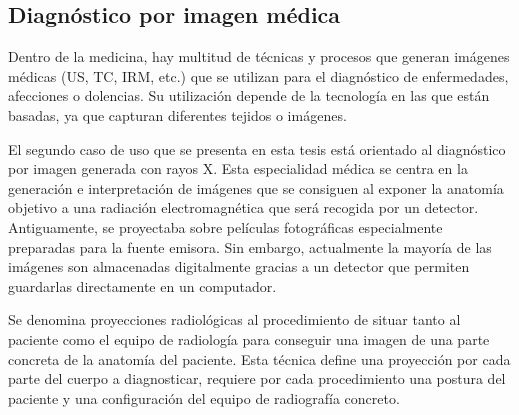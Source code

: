 \subsection{Diagnóstico por imagen médica}
\label{art:xraysim}

Dentro de la medicina, hay multitud de técnicas y procesos que generan imágenes médicas (\ac{US}, \ac{TC}, \ac{IRM}, etc.)  que se utilizan para el diagnóstico de enfermedades, afecciones o dolencias. %
Su utilización depende de la tecnología en las que están basadas, ya que capturan diferentes tejidos o imágenes.

El segundo caso de uso que se presenta en esta tesis está orientado al diagnóstico por imagen generada con rayos X. Esta especialidad médica se centra en la generación e interpretación de imágenes que se consiguen al exponer la anatomía objetivo a una radiación electromagnética que será recogida por un detector. Antiguamente, se proyectaba sobre películas fotográficas especialmente preparadas para la fuente emisora. Sin embargo, actualmente la mayoría de las imágenes son almacenadas digitalmente gracias a un detector que permiten guardarlas directamente en un computador.

Se denomina proyecciones radiológicas al procedimiento de situar tanto al paciente como el equipo de radiología para conseguir una imagen de una parte concreta de la anatomía del paciente. Esta técnica define una proyección por cada parte del cuerpo a diagnosticar, requiere por cada procedimiento una postura del paciente y una configuración del equipo de radiografía concreto.


